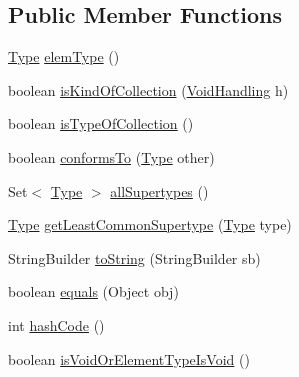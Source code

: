 \subsection*{Public Member Functions}
\begin{DoxyCompactItemize}
\item 
\hyperlink{interfaceorg_1_1tzi_1_1use_1_1uml_1_1ocl_1_1type_1_1_type}{Type} \hyperlink{classorg_1_1tzi_1_1use_1_1uml_1_1ocl_1_1type_1_1_collection_type_a51cda1902aa2b4a9be4a40fa9b5b7aab}{elem\-Type} ()
\item 
boolean \hyperlink{classorg_1_1tzi_1_1use_1_1uml_1_1ocl_1_1type_1_1_collection_type_a7729f8f3b612fec4b42400b894fe52fa}{is\-Kind\-Of\-Collection} (\hyperlink{enumorg_1_1tzi_1_1use_1_1uml_1_1ocl_1_1type_1_1_type_1_1_void_handling}{Void\-Handling} h)
\item 
boolean \hyperlink{classorg_1_1tzi_1_1use_1_1uml_1_1ocl_1_1type_1_1_collection_type_ab9f73ae3344686581a763868b63eddbc}{is\-Type\-Of\-Collection} ()
\item 
boolean \hyperlink{classorg_1_1tzi_1_1use_1_1uml_1_1ocl_1_1type_1_1_collection_type_a2fe510ccc46b5b714d737015dd936f22}{conforms\-To} (\hyperlink{interfaceorg_1_1tzi_1_1use_1_1uml_1_1ocl_1_1type_1_1_type}{Type} other)
\item 
Set$<$ \hyperlink{interfaceorg_1_1tzi_1_1use_1_1uml_1_1ocl_1_1type_1_1_type}{Type} $>$ \hyperlink{classorg_1_1tzi_1_1use_1_1uml_1_1ocl_1_1type_1_1_collection_type_ab1bf7214711439652ace753575d98794}{all\-Supertypes} ()
\item 
\hyperlink{interfaceorg_1_1tzi_1_1use_1_1uml_1_1ocl_1_1type_1_1_type}{Type} \hyperlink{classorg_1_1tzi_1_1use_1_1uml_1_1ocl_1_1type_1_1_collection_type_aa3bf26dc0c070cadaee71029c12b8f73}{get\-Least\-Common\-Supertype} (\hyperlink{interfaceorg_1_1tzi_1_1use_1_1uml_1_1ocl_1_1type_1_1_type}{Type} type)
\item 
String\-Builder \hyperlink{classorg_1_1tzi_1_1use_1_1uml_1_1ocl_1_1type_1_1_collection_type_a7826aa7429f86cdba7d9268a6f6f152b}{to\-String} (String\-Builder sb)
\item 
boolean \hyperlink{classorg_1_1tzi_1_1use_1_1uml_1_1ocl_1_1type_1_1_collection_type_acd0d21c66824d826238b38b28fa25441}{equals} (Object obj)
\item 
int \hyperlink{classorg_1_1tzi_1_1use_1_1uml_1_1ocl_1_1type_1_1_collection_type_a8d6ead83f0dfcfc494eb43a438e55e98}{hash\-Code} ()
\item 
boolean \hyperlink{classorg_1_1tzi_1_1use_1_1uml_1_1ocl_1_1type_1_1_collection_type_a315cf4ae206d5d1e159d97f815bdf894}{is\-Void\-Or\-Element\-Type\-Is\-Void} ()

\end{DoxyCompactItemize}
